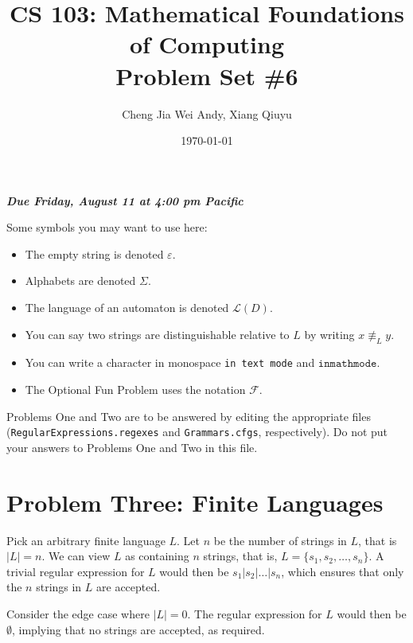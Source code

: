 \documentclass{article}
\title{CS 103: Mathematical Foundations of Computing\\Problem Set \#6}
\author{Cheng Jia Wei Andy, Xiang Qiuyu}
\date{\today}
\renewcommand{\(}{\left(}
\renewcommand{\)}{\right)}
\renewcommand{\emph}[1]{\textit{\textbf{#1}}}
\theoremstyle{plain}
\theoremstyle{plain}
\theoremstyle{definition}
\begin{document}
\maketitle

\begin{center}
  \emph{Due Friday, August 11 at 4:00 pm Pacific}
\end{center}

Some symbols you may want to use here:

\begin{itemize}

\item The empty string is denoted $\varepsilon$.
\item Alphabets are denoted $\Sigma$.
\item The language of an automaton is denoted $\mathscr{L}(D)$.
\item You can say two strings are distinguishable relative to $L$ by writing $x \not\equiv_L y$.
\item You can write a character in monospace \texttt{in text mode} and $\mathtt{in math mode}$.
\item The Optional Fun Problem uses the notation $\mathscr{F}$.

\end{itemize}

\newpage

Problems One and Two are to be answered by editing the appropriate files
(\texttt{RegularExpressions.regexes} and \texttt{Grammars.cfgs}, respectively).
Do not put your answers to Problems One and Two in this file.

\newpage

\section*{Problem Three: Finite Languages}
\begin{shaded}
    Pick an arbitrary finite language $L$. Let $n$ be the number of strings in $L$, that is $|L|=n$. We can view $L$ as containing $n$ strings, that is, $L=\{s_{1},s_{2},\dots,s_{n}\}$. A trivial regular expression for $L$ would then be $s_{1} | s_{2}| \dots | s_{n}$, which ensures that only the $n$ strings in $L$ are accepted.

    \vspace*{4mm}

    Consider the edge case where $|L|=0$. The regular expression for $L$ would then be $\emptyset$, implying that no strings are accepted, as required.
\end{shaded}
\end{document}
